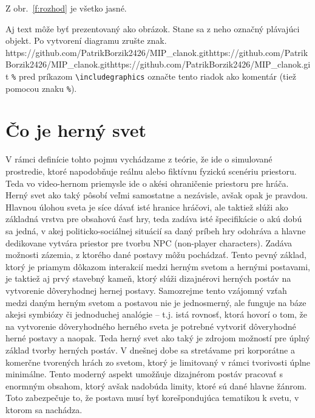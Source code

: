 \documentclass[10pt,twoside,slovak,a4paper]{article}
\begin{document}
Z obr.~\ref{f:rozhod} je všetko jasné. 

\begin{figure*}[tbh]
\centering
Aj text môže byť prezentovaný ako obrázok. Stane sa z neho označný plávajúci objekt. Po vytvorení diagramu zrušte znak. https://github.com/PatrikBorzik2426/MIP_clanok.githttps://github.com/PatrikBorzik2426/MIP_clanok.githttps://github.com/PatrikBorzik2426/MIP_clanok.git \texttt{\%} pred príkazom \verb|\includegraphics| označte tento riadok ako komentár (tiež pomocou znaku \texttt{\%}).
\caption{Rozhodujúci argument.}
\label{f:rozhod}
\end{figure*}



\section{Čo je herný svet} \label{2.0}
V rámci definície tohto pojmu vychádzame z teórie, že ide o simulované prostredie, ktoré napodobňuje reálnu alebo fiktívnu fyzickú scenériu priestoru. Teda vo video-hernom priemysle ide o akési ohraničenie priestoru pre hráča. Herný svet ako taký pôsobí veľmi samostatne a nezávisle, avšak opak je pravdou. Hlavnou úlohou sveta je síce dávať isté hranice hráčovi, ale taktiež slúži ako základná vrstva pre obsahovú časť hry, teda zadáva isté špecifikácie o akú dobú sa jedná, v akej politicko-sociálnej situácií sa daný príbeh hry odohráva a hlavne dedikovane vytvára priestor pre tvorbu NPC (non-player characters). Zadáva možnosti zázemia, z ktorého dané postavy môžu pochádzať. Tento pevný základ, ktorý je priamym dôkazom interakcií medzi herným svetom a hernými postavami,  je taktiež aj prvý stavebný kameň, ktorý slúži dizajnérovi herných postáv na vytvorenie dôveryhodnej hernej postavy. Samozrejme tento vzájomný vzťah medzi daným herným svetom a postavou nie je jednosmerný, ale funguje na báze akejsi symbiózy či jednoduchej analógie – t.j. istá rovnosť, ktorá hovorí o tom, že na vytvorenie dôveryhodného herného sveta je potrebné vytvoriť dôveryhodné herné postavy a naopak. Teda herný svet ako taký je zdrojom možností pre úplný základ tvorby herných postáv. V dnešnej dobe sa stretávame pri korporátne a komerčne tvorených hrách zo svetom, ktorý je limitovaný v rámci tvorivosti úplne minimálne. Tento moderný aspekt umožňuje dizajnérom postáv pracovať s enormným obsahom, ktorý avšak nadobúda limity, ktoré sú dané hlavne žánrom. Toto zabezpečuje to, že postava musí byť korešpondujúca tematikou k svetu, v ktorom sa nachádza.
\end{document}
